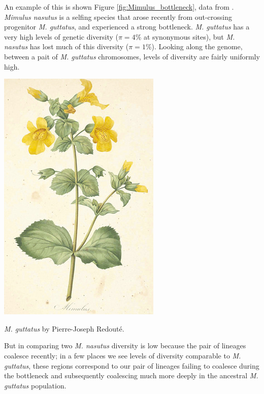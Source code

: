 An example of this is shown Figure
\ref{fig:Mimulus_bottleneck}, data from \citeauthor{brandvain:14}. {\it Mimulus nasutus} is a selfing
species that arose recently from out-crossing progenitor {\it M.
  guttatus}, and experienced a strong bottleneck. {\it M. guttatus} has a very high levels of genetic diversity
($\pi=4\%$ at synonymous sites), but {\it M. nasutus} has lost much 
of this diversity ($\pi =1\%$). Looking along the genome, between a
pait of {\it M. guttatus} chromosomes, levels of
diversity are fairly uniformly high.
\begin{marginfigure}
\begin{center}
  \includegraphics[width = 0.75 \textwidth]{illustration_images/Genetic_drift/Mimulus/Mimulus.png}
\end{center}
\caption{{\it M. guttatus} by Pierre-Joseph
  Redout\'e.} \label{fig:Human_growth}  %
\end{marginfigure}
 But in comparing two {\it
  M. nasutus} diversity is low because the pair of lineages coalesce
recently; in a few places we see levels of diversity comparable to
{\it M. guttatus}, these regions correspond to our pair of lineages
failing to coalesce during the bottleneck and subsequently coalescing
much more deeply in the ancestral {\it M. guttatus} population.


